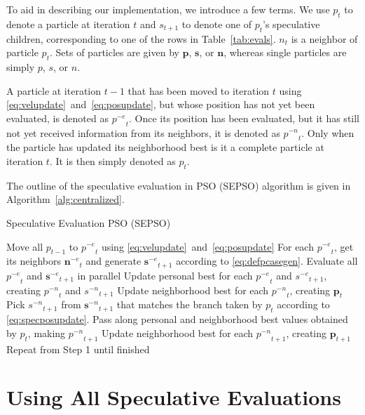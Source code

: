 \documentclass{llncs}
\newcommand{\alg}[1]{Algorithm~\ref{alg:#1}}
\providecommand{\noeval}[1]{\ensuremath{#1^{-e}}}
\providecommand{\nonbest}[1]{\ensuremath{#1^{-n}}}
\providecommand{\p}{\ensuremath{p}}
\providecommand{\pset}{\ensuremath{\mathbf{p}}}
\providecommand{\s}{\ensuremath{s}}
\providecommand{\sset}{\ensuremath{\mathbf{s}}}
\providecommand{\n}{\ensuremath{n}}
\providecommand{\nset}{\ensuremath{\mathbf{n}}}
\begin{document}
To aid in describing our implementation, we introduce a few terms. We use
$\p_t$ to denote a particle at iteration $t$ and $\s_{t+1}$ to denote one of
$\p_t$'s speculative children, corresponding to one of the rows in
Table~\ref{tab:evals}.  $\n_t$ is a neighbor of particle $\p_t$.  Sets of
particles are given by $\pset$, $\sset$, or $\nset$, whereas single particles
are simply $\p$, $\s$, or $\n$.

A particle at iteration $t-1$ that has been moved to iteration $t$ using
\eqref{eq:velupdate}~and~\eqref{eq:posupdate}, but whose position has not yet
been evaluated, is denoted as $\noeval{\p}_t$.  Once its position has been
evaluated, but it has still not yet received information from its neighbors, it
is denoted as $\nonbest{\p}_t$.  Only when the particle has updated its
neighborhood best is it a complete particle at iteration $t$.  It is then
simply denoted as $\p_t$.

The outline of the speculative evaluation in PSO (SEPSO) algorithm is given in
\alg{centralized}.

\begin{algorithm}
  \caption{Speculative Evaluation PSO (SEPSO)}
  \label{alg:centralized}
  \begin{algorithmic}[1]
	\STATE Move all $\p_{t-1}$ to $\noeval{\p}_t$ using
	  \eqref{eq:velupdate}~and~\eqref{eq:posupdate}
	\STATE For each $\noeval{\p}_t$, get its neighbors $\noeval{\nset}_t$ and
	  generate $\noeval{\sset}_{t+1}$ according to
	  \eqref{eq:defpcasegen}.
	\STATE Evaluate all $\noeval{\p}_t$ and $\noeval{\sset}_{t+1}$ in parallel
	\STATE Update personal best for each $\noeval{\p}_t$ and
	  $\noeval{\s}_{t+1}$, creating $\nonbest{\p}_t$ and $\nonbest{\s}_{t+1}$
	\STATE Update neighborhood best for each $\nonbest{\p}_t$, creating
	  $\pset_t$
	\FORALL{$\p_t$}
	\STATE Pick $\nonbest{\s}_{t+1}$ from $\nonbest{\sset}_{t+1}$ that matches
	  the branch taken by $\p_t$ according to
	  \eqref{eq:specposupdate}.
	\STATE Pass along personal and neighborhood best values obtained by $\p_t$,
	  making $\nonbest{\p}_{t+1}$
	\ENDFOR
	\STATE Update neighborhood best for each $\nonbest{\p}_{t+1}$, creating
	  $\pset_{t+1}$
	\STATE Repeat from Step 1 until finished
  \end{algorithmic}
\end{algorithm}

\section{Using All Speculative Evaluations}
\label{sec:extra}
\end{document}
